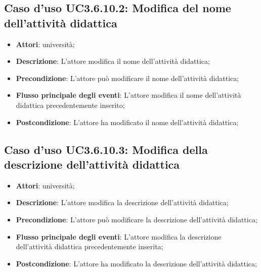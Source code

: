 \subsection{Caso d'uso \texorpdfstring{UC3.6.10.2}{UC3.6.10.2}: Modifica del nome dell’attività didattica}
\begin{itemize}
\item \textbf{Attori}: università;
\item \textbf{Descrizione}: L'attore modifica il nome dell’attività didattica;

\item \textbf{Precondizione}: L'attore può modificare il nome dell’attività didattica;

\item \textbf{Flusso principale degli eventi}: L'attore modifica il nome dell’attività didattica precedentemente inserito;

\item \textbf{Postcondizione}: L'attore ha modificato il nome dell’attività didattica;

\end{itemize}
\subsection{Caso d'uso \texorpdfstring{UC3.6.10.3}{UC3.6.10.3}: Modifica della descrizione dell’attività didattica}
\begin{itemize}
\item \textbf{Attori}: università;
\item \textbf{Descrizione}: L'attore modifica la descrizione dell’attività didattica;

\item \textbf{Precondizione}: L'attore può modificare la descrizione dell’attività didattica;

\item \textbf{Flusso principale degli eventi}: L'attore modifica la descrizione dell’attività didattica precedentemente inserita;

\item \textbf{Postcondizione}: L'attore ha modificato la descrizione dell’attività didattica;

\end{itemize}
